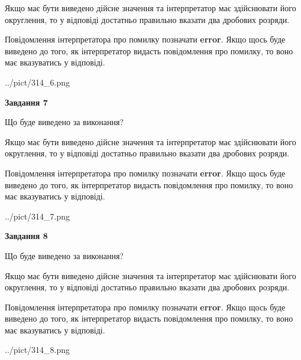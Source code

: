 \documentclass[12pt, ukrainian]{article}
\begin{document}
{\begin {Large}
Якщо має бути виведено дійсне значення та інтерпретатор має здійснювати його округлення, 
то у відповіді достатньо правильно вказати два дробових розряди.

Повідомлення інтерпретатора про помилку позначати \textbf{error}.
Якщо щось буде виведено до того, як інтерпретатор видасть повідомлення про помилку, 
то воно має вказуватись у відповіді. \par

\begin{center}
	{../pict/314_6.png}
\end{center}
\newpage

{\begin {center}\textbf{Завдання 7}\end {center}}\par
Що буде виведено за виконання? \par

Якщо має бути виведено дійсне значення та інтерпретатор має здійснювати його округлення, 
то у відповіді достатньо правильно вказати два дробових розряди.

Повідомлення інтерпретатора про помилку позначати \textbf{error}.
Якщо щось буде виведено до того, як інтерпретатор видасть повідомлення про помилку, 
то воно має вказуватись у відповіді. \par

\begin{center}
	{../pict/314_7.png}
\end{center}
\newpage

{\begin {center}\textbf{Завдання 8}\end {center}}\par
Що буде виведено за виконання? \par

Якщо має бути виведено дійсне значення та інтерпретатор має здійснювати його округлення, 
то у відповіді достатньо правильно вказати два дробових розряди.

Повідомлення інтерпретатора про помилку позначати \textbf{error}.
Якщо щось буде виведено до того, як інтерпретатор видасть повідомлення про помилку, 
то воно має вказуватись у відповіді. \par

\begin{center}
	{../pict/314_8.png}
\end{center}
\newpage


\end{Large}}
\end{document}
